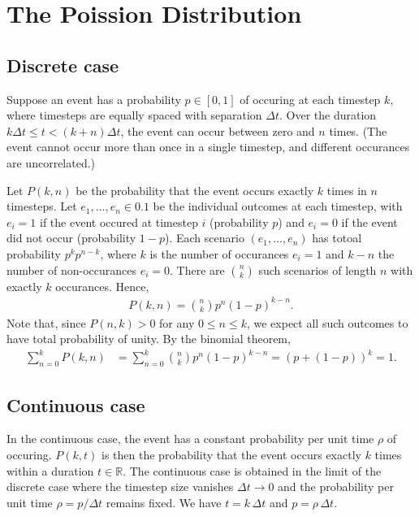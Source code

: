 \documentclass{article}
\begin{document}
\section*{The Poission Distribution}

\subsection*{Discrete case}

Suppose an event has a probability $p \in [0, 1]$ of occuring at each timestep $k$, where timesteps are equally spaced with separation $Δt$.
Over the duration $kΔt ≤ t < (k + n)Δt$, the event can occur between zero and $n$ times. (The event cannot occur more than once in a single timestep, and different occurances are uncorrelated.)


Let $P(k, n)$ be the probability that the event occurs exactly $k$ times in $n$ timesteps.
Let $e_1, …, e_n \in \qty{0, 1}$ be the individual outcomes at each timestep, with $e_i = 1$ if the event occured at timestep $i$ (probability $p$) and $e_i = 0$ if the event did not occur (probability $1 - p$).
Each scenario $(e_1, …, e_n)$ has totoal probability $p^k p^{n - k}$, where $k$ is the number of occurances $e_i = 1$ and $k - n$ the number of non-occurances $e_i = 0$.
There are $\binom{n}{k}$ such scenarios of length $n$ with exactly $k$ occurances.
Hence,
\begin{align}
	P(k, n) = \binom{n}{k} p^n (1 - p)^{k - n}
.\end{align}
Note that, since $P(n, k) > 0$ for any $0 ≤ n ≤ k$, we expect all such outcomes to have total probability of unity.
By the binomial theorem,
\begin{align}
	\sum_{n = 0}^k P(k, n)
	&= \sum_{n = 0}^k \binom{n}{k} p^n (1 - p)^{k - n}
	= (p + (1 - p))^k = 1
.\end{align}

\subsection*{Continuous case}

In the continuous case, the event has a constant probability per unit time $ρ$ of occuring.
$P(k, t)$ is then the probability that the event occurs exactly $k$ times within a duration $t \in \mathds R$.
The continuous case is obtained in the limit of the discrete case where the timestep size vanishes $Δt → 0$ and the probability per unit time $ρ = p/Δt$ remains fixed.
We have $t = k\,Δt$ and $p = ρ\,Δt$.
\end{document}
